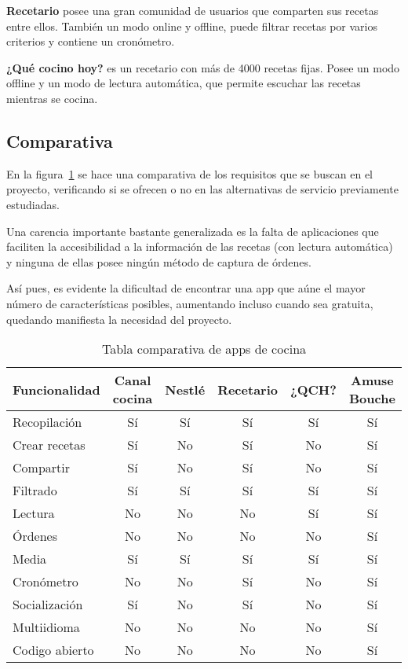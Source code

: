 \textbf{Recetario} posee una gran comunidad de usuarios que comparten sus
recetas entre ellos. También un modo online y offline, puede filtrar recetas
por varios criterios y contiene un cronómetro.

\textbf{¿Qué cocino hoy?} es un recetario con más de 4000 recetas fijas. Posee
un modo offline y un modo de lectura automática, que permite escuchar las recetas
mientras se cocina.

\subsection{Comparativa}

En la figura~\ref{comparativa_apps} se hace una comparativa de los requisitos
que se buscan en el proyecto, verificando si se ofrecen o no en las alternativas
de servicio previamente estudiadas.

Una carencia importante bastante generalizada es la falta de aplicaciones que
faciliten la accesibilidad a la información de las recetas (con lectura
automática) y ninguna de ellas posee ningún método de captura de órdenes.

Así pues, es evidente la dificultad de encontrar una app que aúne el mayor
número de características posibles, aumentando incluso cuando sea gratuita,
quedando manifiesta la necesidad del proyecto.


\begin{table}[h]
  \centering
  \begin{tabular}{|l|c|c|c|c|c|}
    \hline
    \textbf{Funcionalidad} & \textbf{Canal cocina} & \textbf{Nestlé} &
    \textbf{Recetario} & \textbf{¿QCH?} & \textbf{Amuse Bouche}\\
    \hline
    Recopilación & Sí & Sí & Sí & Sí & Sí \\
    \hline
    Crear recetas & Sí & No & Sí & No & Sí \\
    \hline
    Compartir & Sí & No & Sí & No & Sí \\
    \hline
    Filtrado & Sí & Sí & Sí & Sí & Sí \\
    \hline
    Lectura & No & No & No & Sí & Sí \\
    \hline
    Órdenes & No & No & No & No & Sí \\
    \hline
    Media & Sí & Sí & Sí & Sí & Sí \\
    \hline
    Cronómetro & No & No & Sí & No & Sí \\
    \hline
    Socialización & Sí & No & Sí & No & Sí \\
    \hline
    Multiidioma & No & No & No & No & Sí \\
    \hline
    Codigo abierto & No & No & No & No & Sí \\
    \hline
  \end{tabular}
  \caption{Tabla comparativa de apps de cocina}
  \label{comparativa_apps}
\end{table}


